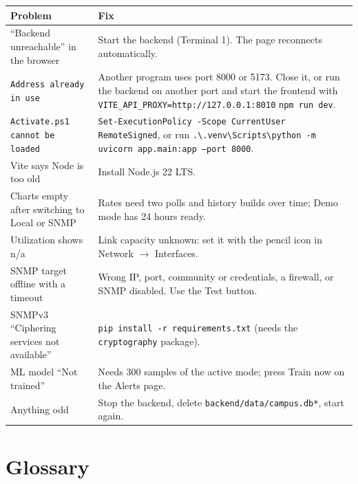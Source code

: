 \documentclass[11pt,a4paper]{article}
\newcommand{\code}[1]{\texttt{#1}}
\newcommand{\file}[1]{\texttt{\color{ink}#1}}
\begin{document}
\begin{center}
\small
\begin{tabularx}{\linewidth}{@{}>{\raggedright\arraybackslash}p{5.2cm} Y@{}}
\toprule
\textbf{Problem} & \textbf{Fix} \\
\midrule
``Backend unreachable'' in the browser & Start the backend (Terminal 1). The page reconnects automatically. \\
\code{Address already in use} & Another program uses port 8000 or 5173. Close it, or run the backend on another port and start the
frontend with \code{VITE\_API\_PROXY=http://127.0.0.1:8010} \code{npm run dev}. \\
\code{Activate.ps1 cannot be loaded} & \code{Set-ExecutionPolicy -Scope CurrentUser RemoteSigned}, or run
\code{.\textbackslash.venv\textbackslash Scripts\textbackslash python -m uvicorn app.main:app --port 8000}. \\
Vite says Node is too old & Install Node.js 22 LTS. \\
Charts empty after switching to Local or SNMP & Rates need two polls and history builds over time; Demo mode has 24 hours ready. \\
Utilization shows n/a & Link capacity unknown: set it with the pencil icon in Network $\rightarrow$ Interfaces. \\
SNMP target offline with a timeout & Wrong IP, port, community or credentials, a firewall, or SNMP disabled. Use the Test button. \\
SNMPv3 ``Ciphering services not available'' & \code{pip install -r requirements.txt} (needs the \code{cryptography} package). \\
ML model ``Not trained'' & Needs 300 samples of the active mode; press Train now on the Alerts page. \\
Anything odd & Stop the backend, delete \file{backend/data/campus.db*}, start again. \\
\bottomrule
\end{tabularx}
\end{center}

\section{Glossary}
\end{document}
